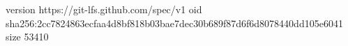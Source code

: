 version https://git-lfs.github.com/spec/v1
oid sha256:2cc7824863ecfaa4d8bf818b03bae7dec30b689f87d6f6d8078440dd105e6041
size 53410
